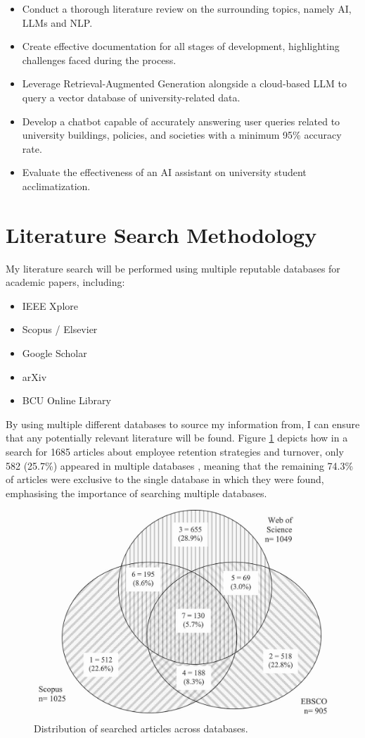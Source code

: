 \documentclass[12pt]{report}
\begin{document}
    \begin{itemize}
        \item Conduct a thorough literature review on the surrounding topics, namely AI, LLMs and NLP.
        \item Create effective documentation for all stages of development, highlighting challenges faced during the process.
        \item Leverage Retrieval-Augmented Generation alongside a cloud-based LLM to query a vector database of university-related data.
        \item Develop a chatbot capable of accurately answering user queries related to university 
        buildings, policies, and societies with a minimum 95\% accuracy rate.
        \item Evaluate the effectiveness of an AI assistant on university student acclimatization.
    \end{itemize}

    \pagebreak %

    \section{Literature Search Methodology}

    \noindent 
    My literature search will be performed using multiple reputable databases for academic papers, including:
    \begin{itemize}
        \item IEEE Xplore
        \item Scopus / Elsevier
        \item Google Scholar
        \item arXiv
        \item BCU Online Library
    \end{itemize}
    
    \noindent By using multiple different databases to source my information from, I can ensure that
    any potentially relevant literature will be found. Figure \ref{fig:litSearch} depicts 
    how in a search for 1685 articles about employee retention strategies and turnover, only 582 (25.7\%) appeared in multiple databases
    \autocite{litSearch}, meaning that the remaining 74.3\% of articles were exclusive to the single 
    database in which they were found, emphasising the importance of searching multiple databases.  

    \begin{figure}[H]
        \centering
        \includegraphics[width=.5\linewidth]{litSearchDBs.jpg}
        \caption{Distribution of searched articles across databases. \autocite{litSearch}}
        \label{fig:litSearch}
    \end{figure}
   
\end{document}
